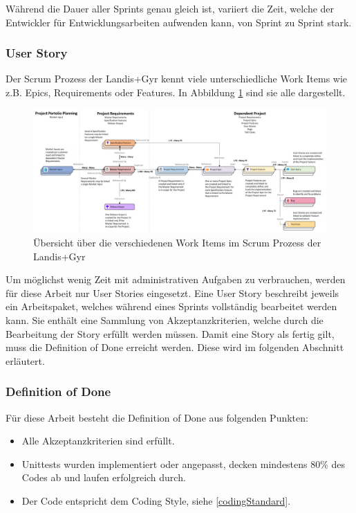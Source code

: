 Während die Dauer aller Sprints genau gleich ist, variiert die Zeit, welche der Entwickler für Entwicklungsarbeiten aufwenden kann, von Sprint zu Sprint stark.

\subsubsection{User Story}\label{userstory}
Der Scrum Prozess der Landis+Gyr kennt viele unterschiedliche Work Items wie z.B. Epics, Requirements oder Features.
In Abbildung \ref{fig:workitems} sind sie alle dargestellt.
\begin{figure}[H]
   \centering
   \includegraphics[width=1.0\textwidth]{gfx/WorkItemRelationsship.png}
   \caption{
      Übersicht über die verschiedenen Work Items im Scrum Prozess der Landis+Gyr
      }
      \label{fig:workitems}
\end{figure}
Um möglichst wenig Zeit mit administrativen Aufgaben zu verbrauchen, werden für diese Arbeit nur User Stories eingesetzt.
Eine User Story beschreibt jeweils ein Arbeitspaket, welches während eines Sprints vollständig bearbeitet werden kann.
Sie enthält eine Sammlung von Akzeptanzkriterien, welche durch die Bearbeitung der Story erfüllt werden müssen.
Damit eine Story als fertig gilt, muss die Definition of Done erreicht werden. Diese wird im folgenden Abschnitt erläutert.


\subsubsection{Definition of Done}
Für diese Arbeit besteht die Definition of Done aus folgenden Punkten:
\begin{itemize}
   \item Alle Akzeptanzkriterien sind erfüllt.
   \item Unittests wurden implementiert oder angepasst, decken mindestens 80\% des Codes ab und laufen erfolgreich durch.
   \item Der Code entspricht dem Coding Style, siehe \ref{codingStandard}.
\end{itemize}

